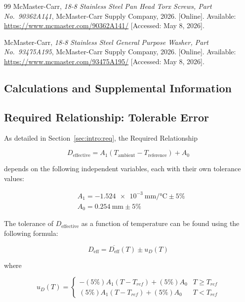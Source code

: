 \documentclass[12pt, letterpaper]{report}%
\newcommand{\requiredRelationship}{D_{\text{effective}} = A_1 (T_{\text{ambient}} - T_{\text{reference}}) + A_0}
\newcommand{\AoneExact}{\SI{-1.524e-3}{\milli\meter\per\celsius}}
\newcommand{\Aone}{\AoneExact \pm 5\%}
\newcommand{\AzeroExact}{\SI{0.254}{\milli\meter}}
\newcommand{\Azero}{\AzeroExact \pm 5\%}
\begin{document}
\begin{thebibliography}{99}
	McMaster-Carr, \textit{18-8 Stainless Steel Pan Head Torx Screws,
	Part No.\ 90362A141}, McMaster-Carr Supply Company, 2026. [Online].
	Available: \url{https://www.mcmaster.com/90362A141/}
	[Accessed: May 8, 2026].

	McMaster-Carr, \textit{18-8 Stainless Steel General Purpose Washer,
	Part No.\ 93475A195}, McMaster-Carr Supply Company, 2026. [Online].
	Available: \url{https://www.mcmaster.com/93475A195/}
	[Accessed: May 8, 2026].

\end{thebibliography}


\newpage
\begin{appendices}
\appendix

\chapter{Calculations and Supplemental Information}
\label{app:calcs}

	\section{Required Relationship: Tolerable Error}
	\label{app:calcs:errorProp}

		As detailed in Section~\ref{sec:intro:req}, the Required Relationship

			$$ \requiredRelationship $$

		depends on the following independent variables, each with their own tolerance values:

			\begin{align*}
				&A_1 = \Aone
				\\
				&A_0 = \Azero
			\end{align*}

		The tolerance of $D_{\text{effective}}$ as a function of temperature can be found using the following formula:

			\begin{equation}
				D_{\text{eff}} = \overline{D_{\text{eff}}}(T) \pm u_D(T)
				\label{eq:error_gen}
			\end{equation}

		where

			\begin{equation}
				u_D(T) =
				\begin{cases}
					- (5 \%) A_1 (T - T_{ref}) + (5 \%) A_0 & T \geq T_{ref} \\
					 (5 \%) A_1 (T - T_{ref}) + (5 \%) A_0 & T < T_{ref}
				\end{cases}
				\label{eq:error_particular}
			\end{equation}


\end{appendices}
\end{document}
